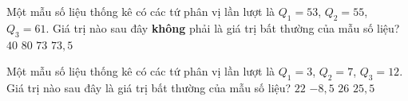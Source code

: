 \begin{ex}%
	Một mẫu số liệu thống kê có các tứ phân vị lần lượt là $Q_1=53$, $Q_2= 55$, 
	$Q_3= 61$. Giá trị nào sau đây \textbf{không} phải là giá trị bất thường 
	của mẫu số liệu?
	\choice
	{$40$}
	{$80$}
	{\True $73$}
	{$73{,}5$} 
\end{ex}

\begin{ex}%
	Một mẫu số liệu thống kê có các tứ phân vị lần lượt là $Q_1=3$, $Q_2= 7$, 
	$Q_3= 12$. Giá trị nào sau đây  là giá trị bất thường 
	của mẫu số liệu?
	\choice
	{$22$}
	{$-8{,}5$}
	{\True $26$}
	{$25{,}5$} 
\end{ex}

